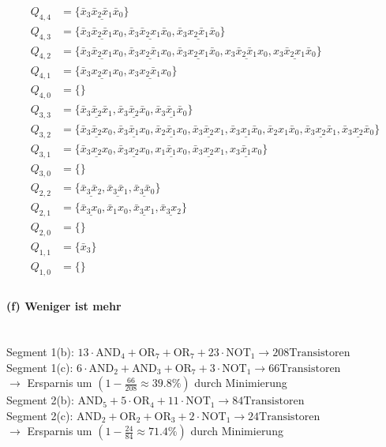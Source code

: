 \documentclass[a4paper]{article}
\begin{document}
\begin{align*}
	Q_{4,4} &= \{\underline{\bar{x}_3\bar{x}_2\bar{x}_1\bar{x}_0}\}\\
	Q_{4,3} &= \{\underline{\bar{x}_3\bar{x}_2\bar{x}_1x_0}, \underline{\bar{x}_3\bar{x}_2x_1\bar{x}_0}, \underline{\bar{x}_3x_2\bar{x}_1\bar{x}_0}\}\\
	Q_{4,2} &= \{\underline{\bar{x}_3\bar{x}_2x_1x_0}, \underline{\bar{x}_3x_2\bar{x}_1x_0}, \underline{\bar{x}_3x_2x_1\bar{x}_0}, \underline{x_3\bar{x}_2\bar{x}_1x_0}, \underline{x_3\bar{x}_2x_1\bar{x}_0}\}\\
	Q_{4,1} &= \{\underline{\bar{x}_3x_2x_1x_0}, \underline{x_3x_2\bar{x}_1x_0}\}\\
	Q_{4,0} &= \{ \}\\
	\hline
	Q_{3,3} &= \{\underline{\bar{x}_3\bar{x}_2\bar{x}_1}, \underline{\bar{x}_3\bar{x}_2\bar{x}_0}, \underline{\bar{x}_3\bar{x}_1\bar{x}_0}\}\\
	Q_{3,2} &= \{\underline{\bar{x}_3\bar{x}_2x_0}, \underline{\bar{x}_3\bar{x}_1x_0}, \underline{\bar{x}_2\bar{x}_1x_0}, \underline{\bar{x}_3\bar{x}_2x_1}, \underline{\bar{x}_3x_1\bar{x}_0}, \bar{x}_2x_1\bar{x}_0, \underline{\bar{x}_3x_2\bar{x}_1}, \underline{\bar{x}_3x_2\bar{x}_0}\}\\
	Q_{3,1} &= \{\underline{\bar{x}_3x_2x_0}, \underline{\bar{x}_3x_2x_0}, \underline{x_1\bar{x}_1x_0}, \underline{\bar{x}_3x_2x_1}, \underline{x_3\bar{x}_1x_0}\}\\
	Q_{3,0} &= \{ \}\\
	\hline
	Q_{2,2} &= \{\underline{\bar{x}_3\bar{x}_2}, \underline{\bar{x}_3\bar{x}_1}, \underline{\bar{x}_3\bar{x}_0}\}\\
	Q_{2,1} &= \{\underline{\bar{x}_3x_0}, \bar{x}_1x_0, \underline{\bar{x}_3x_1}, \underline{\bar{x}_3x_2}\}\\
	Q_{2,0} &= \{ \}\\
	\hline
	Q_{1,1} &= \{\bar{x}_3\}\\
	Q_{1,0} &= \{ \}\\
\end{align*}

\paragraph{(f) Weniger ist mehr}\mbox{}\\
Segment 1(b): $13\cdot\text{AND}_4 + \text{OR}_7 + \text{OR}_7 + 23\cdot\text{NOT}_1 \rightarrow 208\text{Transistoren}$\\
Segment 1(c): $6\cdot\text{AND}_2 + \text{AND}_3 + \text{OR}_7 + 3\cdot\text{NOT}_1 \rightarrow 66\text{Transistoren}$\\
$\rightarrow$ Ersparnis um $(1-\frac{66}{208}\approx39.8\%)$ durch Minimierung\\
Segment 2(b): $\text{AND}_5 + 5\cdot\text{OR}_4 + 11\cdot\text{NOT}_1 \rightarrow 84\text{Transistoren}$\\
Segment 2(c): $\text{AND}_2 + \text{OR}_2 + \text{OR}_3 + 2\cdot\text{NOT}_1 \rightarrow 24\text{Transistoren}$\\
$\rightarrow$ Ersparnis um $(1-\frac{24}{84}\approx71.4\%)$ durch Minimierung\\
\end{document}
